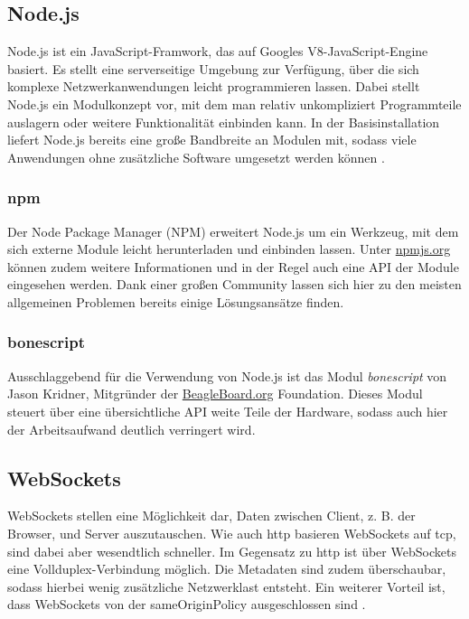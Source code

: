\subsection{Node.js}
\label{subsec:Node.js}
Node.js ist ein JavaScript-Framwork, das auf Googles V8-JavaScript-Engine basiert. Es stellt eine serverseitige Umgebung zur Verfügung, über die sich komplexe Netzwerkanwendungen leicht programmieren lassen. Dabei stellt Node.js ein Modulkonzept vor, mit dem man relativ unkompliziert Programmteile auslagern oder weitere Funktionalität einbinden kann. In der Basisinstallation liefert Node.js bereits eine große Bandbreite an Modulen mit, sodass viele Anwendungen ohne zusätzliche Software umgesetzt werden können \cite{springer2013}.

\subsubsection{npm}
Der Node Package Manager (NPM) erweitert Node.js um ein Werkzeug, mit dem sich externe Module leicht herunterladen und einbinden lassen. Unter \href{https://www.npmjs.org/}{npmjs.org} können zudem weitere Informationen und in der Regel auch eine API der Module eingesehen werden. Dank einer großen Community lassen sich hier zu den meisten allgemeinen Problemen bereits einige Lösungsansätze finden.

\subsubsection{bonescript}
Ausschlaggebend für die Verwendung von Node.js ist das Modul \textit{bonescript} von Jason Kridner, Mitgründer der \href{http://beagleboard.org/}{BeagleBoard.org} Foundation. Dieses Modul steuert über eine übersichtliche API weite Teile der Hardware, sodass auch hier der Arbeitsaufwand deutlich verringert wird.

\subsection{WebSockets}
WebSockets stellen eine Möglichkeit dar, Daten zwischen Client, z. B. der Browser, und Server auszutauschen. Wie auch \gls{http} basieren WebSockets auf \gls{tcp}, sind dabei aber wesendtlich schneller. Im Gegensatz zu \gls{http} ist über WebSockets eine Vollduplex-Verbindung möglich. Die Metadaten sind zudem überschaubar, sodass hierbei wenig zusätzliche Netzwerklast entsteht. Ein weiterer Vorteil ist, dass WebSockets von der \gls{sameOriginPolicy} ausgeschlossen sind \cite{rfc6455}.